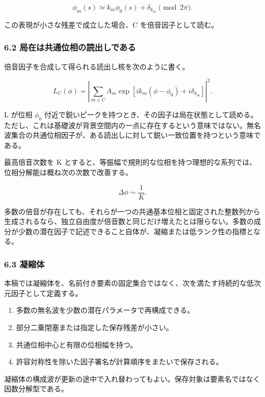 \documentclass[
  a4paper,
]{ltjsarticle}
\providecommand{\tightlist}{%
  \setlength{\itemsep}{0pt}\setlength{\parskip}{0pt}}
\begin{document}
\[
\phi_m(s)
\simeq
k_m\phi_0(s)+\delta_{k_m}
\pmod{2\pi}.
\]

この表現が小さな残差で成立した場合、C を倍音因子として読む。

\subsubsection{6.2
局在は共通位相の読出しである}\label{ux5c40ux5728ux306fux5171ux901aux4f4dux76f8ux306eux8aadux51faux3057ux3067ux3042ux308b}

倍音因子を合成して得られる読出し核を次のように書く。

\[
L_C(\phi)
=
\left|
\sum_{m\in C}
A_m
\exp\left[
i k_m(\phi-\phi_0)
+i\delta_{k_m}
\right]
\right|^2.
\]

L が位相 \(\phi_0\)
付近で鋭いピークを持つとき、その因子は局在状態として読める。ただし、これは基礎波が背景空間内の一点に存在するという意味ではない。無名波集合の共通位相因子が、ある読出しに対して鋭い一致位置を持つという意味である。

最高倍音次数を K
とすると、等振幅で規則的な位相を持つ理想的な系列では、位相分解能は概ね次の次数で改善する。

\[
\Delta\phi
\sim
\frac{1}{K}.
\]

多数の倍音が存在しても、それらが一つの共通基本位相と固定された整数列から生成されるなら、独立自由度が倍音数と同じだけ増えたとは限らない。多数の成分が少数の潜在因子で記述できること自体が、凝縮または低ランク性の指標となる。

\subsubsection{6.3 凝縮体}\label{ux51ddux7e2eux4f53}

本稿では凝縮体を、名前付き要素の固定集合ではなく、次を満たす持続的な低次元因子として定義する。

\begin{enumerate}
\def\labelenumi{\arabic{enumi}.}
\tightlist
\item
  多数の無名波を少数の潜在パラメータで再構成できる。
\item
  部分二乗閉塞または指定した保存残差が小さい。
\item
  共通位相中心と有限の位相幅を持つ。
\item
  許容対称性を除いた因子署名が計算順序をまたいで保存される。
\end{enumerate}

凝縮体の構成波が更新の途中で入れ替わってもよい。保存対象は要素名ではなく因数分解型である。
\end{document}
